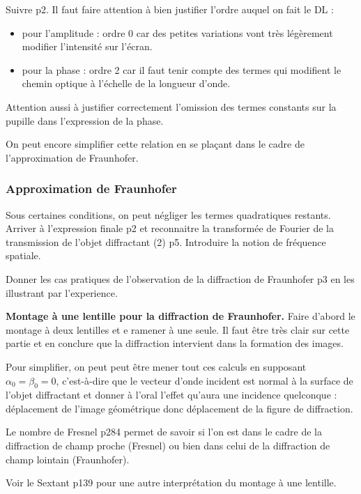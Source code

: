 Suivre \cite{Sayrin2019} p2.
Il faut faire attention à bien justifier l'ordre auquel on fait le DL :
\begin{itemize}
\item pour l'amplitude : ordre 0 car des petites variations vont très légèrement modifier l'intensité sur l'écran.
\item pour la phase : ordre 2 car il faut tenir compte des termes qui modifient le chemin optique à l'échelle de la longueur d'onde.
\end{itemize}
Attention aussi à justifier correctement l'omission des termes constants sur la pupille dans l'expression de la phase.

\begin{transition}
On peut encore simplifier cette relation en se plaçant dans le cadre de l'approximation de Fraunhofer.
\end{transition}

\subsubsection{Approximation de Fraunhofer}

Sous certaines conditions, on peut négliger les termes quadratiques restants.
Arriver à l'expression finale \cite{Sayrin2019} p2 et reconnaitre la transformée de Fourier de la transmission de l'objet diffractant \cite{Sayrin2019} (2) p5.
Introduire la notion de fréquence spatiale.

Donner les cas pratiques de l'observation de la diffraction de Fraunhofer \cite{Sayrin2019} p3 en les illustrant par l'experience.

\begin{experience}
\textbf{Montage à une lentille pour la diffraction de Fraunhofer.}
Faire d'abord le montage à deux lentilles et e ramener à une seule.
Il faut être très clair sur cette partie et en conclure que la diffraction intervient dans la formation des images.
\end{experience}

\begin{remarque}
Pour simplifier, on peut peut être mener tout ces calculs en supposant $\alpha_0 = \beta_0 = 0$, c'est-à-dire que le vecteur d'onde incident est normal à la surface de l'objet diffractant et donner à l'oral l'effet qu'aura une incidence quelconque : déplacement de l'image géométrique donc déplacement de la figure de diffraction.

\noindent
Le nombre de Fresnel \cite{Fruchart2016} p284 permet de savoir si l'on est dans le cadre de la diffraction de champ proche (Fresnel) ou bien dans celui de la diffraction de champ lointain (Fraunhofer).

\noindent
Voir le Sextant p139 pour une autre interprétation du montage à une lentille.
\end{remarque}

